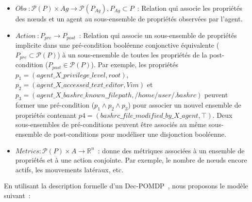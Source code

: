 \begin{itemize}
  \item $Obs~: \mathcal{P}(P) \times Ag \rightarrow \mathcal{P}(P_{Ag}), P_{Ag} \subset P$~: Relation qui associe les propriétés des nœuds et un agent au sous-ensemble de propriétés observées par l'agent.



  \item $Action~: P_{pre} \rightarrow P_{post}$~: Relation qui associe un sous-ensemble de propriétés implicite dans une pré-condition booléenne conjonctive équivalente ($P_{pre} \subset \mathcal{P}(P)$) à un sous-ensemble de toutes les propriétés de la post-condition ($P_{post} \in \mathcal{P}(P)$). Par exemple, les propriétés $p_1 = (agent\_X \allowbreak \_privilege\_level, \allowbreak root)$, $p_2 = (agent\_X \allowbreak \_accessed\_text\_editor, \allowbreak Vim)$ et $p_3 = (agent\_X\_bashrc\_known \allowbreak \_filepath, \allowbreak /home/user/.bashrc)$ peuvent former une pré-condition ($p_1 \land p_2 \land p_3$) pour associer un nouvel ensemble de propriétés contenant $p4 = (bashrc\_file\_modified\_by\_X\_agent, \top)$. Deux sous-ensembles de pré-conditions peuvent être associés au même sous-ensemble de post-conditions pour modéliser une disjonction booléenne.

  \item $Metrics: \mathcal{P}(P) \times A \rightarrow \mathbb{R}^{n}$~: donne des métriques associées à un ensemble de propriétés et à une action conjointe. Par exemple, le nombre de nœuds encore actifs, les mouvements latéraux, etc.

\end{itemize}


En utilisant la description formelle d'un Dec-POMDP~\cite{Oliehoek2016}, nous proposons le modèle suivant~:

